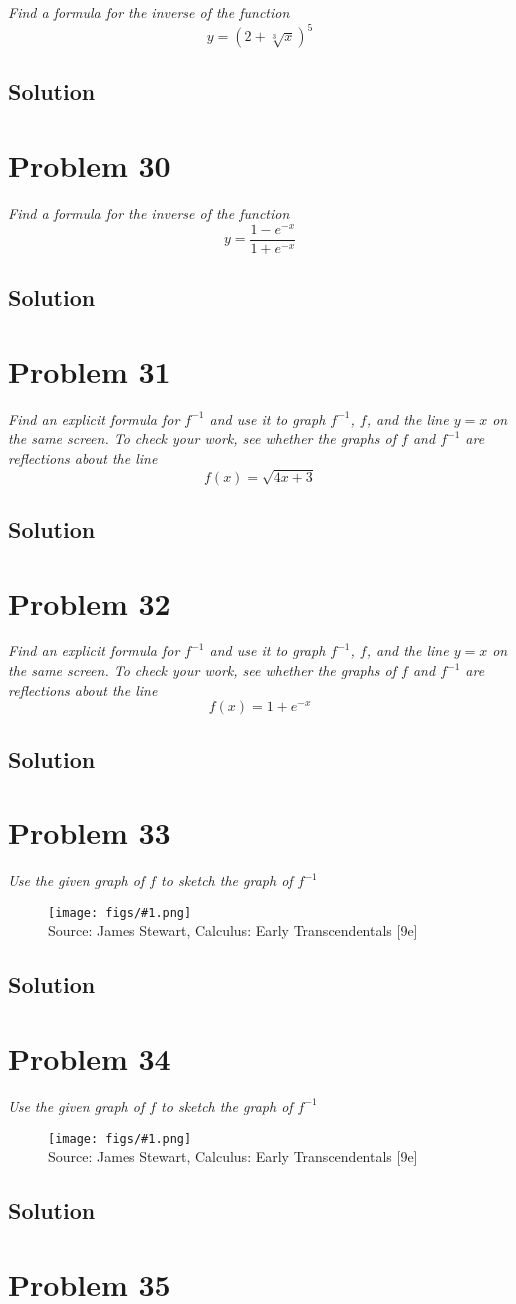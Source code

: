 \documentclass[11pt]{article}
\newcommand{\soln}{\subsection*}
\newcommand{\qn}{\textit}
\newcommand{\imagesource}[1]{{\footnotesize Source: #1}}
\newcommand{\imgqn}[1]{
	\begin{figure}[H]
		\centering
		\texttt{[image: figs/\#1.png]}\\
		\imagesource{James Stewart, Calculus: Early Transcendentals [9e]}
	\end{figure}
}
\begin{document}
\qn{Find a formula for the inverse of the function $$y=(2+\sqrt[3]{x})^5$$}

\soln{Solution}

\section*{Problem 30}

\qn{Find a formula for the inverse of the function $$y=\frac{1-e^{-x}}{1+e^{-x}}$$}

\soln{Solution}

\section*{Problem 31}

\qn{Find an explicit formula for $f^{-1}$ and use it to graph $f^{-1}$, $f$, and the line $y=x$ on the same screen. To check your work, see whether the graphs of $f$ and $f^{-1}$ are reflections about the line $$f(x)=\sqrt{4x+3}$$}

\soln{Solution}

\section*{Problem 32}

\qn{Find an explicit formula for $f^{-1}$ and use it to graph $f^{-1}$, $f$, and the line $y=x$ on the same screen. To check your work, see whether the graphs of $f$ and $f^{-1}$ are reflections about the line $$f(x)=1+e^{-x}$$}

\soln{Solution}

\section*{Problem 33}

\qn{Use the given graph of $f$ to sketch the graph of $f^{-1}$}
\imgqn{1.5.33}

\soln{Solution}

\section*{Problem 34}

\qn{Use the given graph of $f$ to sketch the graph of $f^{-1}$}
\imgqn{1.5.34}

\soln{Solution}

\section*{Problem 35}
\end{document}
